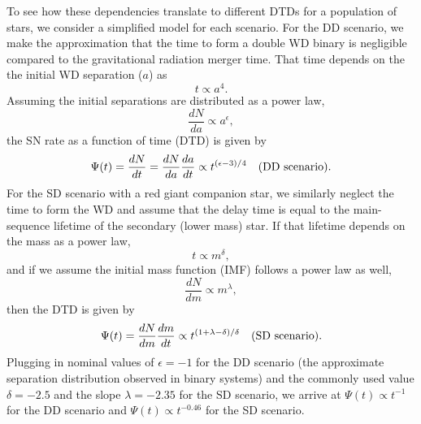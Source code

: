 To see how these dependencies translate to different DTDs for a
population of stars, we consider a simplified model for each
scenario. For the DD scenario, we make the approximation that the time
to form a double WD binary is negligible compared to the gravitational
radiation merger time. That time depends on the the initial WD
separation ($a$) as
\begin{equation}
t \propto a^4.
\end{equation}
Assuming the initial separations are distributed as a power law,
\begin{equation}
\frac{dN}{da} \propto a^\epsilon ,
\end{equation}
the SN rate as a function of time (DTD) is given by 
\begin{equation}
\Psi (t) = \frac{dN}{dt} = \frac{dN}{da} \frac{da}{dt} \propto 
t^{(\epsilon -3)/4} \quad {\rm (DD~scenario).} 
\end{equation}
For the SD scenario with a red giant companion star, we similarly
neglect the time to form the WD and assume that the delay time is
equal to the main-sequence lifetime of the secondary (lower mass)
star. If that lifetime depends on the mass as a power law,
\begin{equation}
t \propto m^\delta,
\end{equation}
and if we assume the initial mass function (IMF) follows a power law as well,
\begin{equation}
\frac{dN}{dm} \propto m^\lambda ,
\end{equation}
then the DTD is given by
\begin{equation}
\Psi (t) = \frac{dN}{dm} \frac{dm}{dt} \propto t^{(1+\lambda-\delta)/\delta}
\quad {\rm (SD~scenario)}.
\end{equation}
Plugging in nominal values of $\epsilon = -1$ for the DD scenario (the
approximate separation distribution observed in binary systems) and the
commonly used value $\delta = -2.5$ and the \citet{salpeter55a} slope
$\lambda=-2.35$ for the SD scenario, we arrive at $\Psi (t) \propto
t^{-1}$ for the DD scenario and $\Psi (t) \propto t^{-0.46}$ for the
SD scenario.

